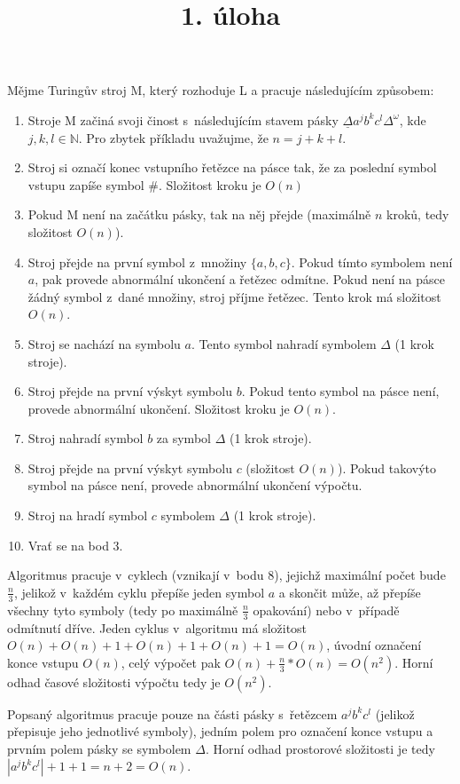 \documentclass[a4paper]{article}
\title {1. úloha}
\begin{document}
\section*{}
Mějme Turingův stroj M, který rozhoduje L a pracuje následujícím způsobem:
\begin{enumerate}
    \item Stroje M začiná svoji činost s~následujícím stavem pásky $\underline{\Delta}a^j b^k c^l\Delta^{\omega}$, kde $j,k,l \in \mathbb{N}$.
    Pro zbytek příkladu uvažujme, že $n=j+k+l$.
    \item Stroj si označí konec vstupního řetězce na pásce tak, že za poslední symbol vstupu zapíše symbol $\#$.
    Složitost kroku je $O(n)$
    \item Pokud M není na začátku pásky, tak na něj přejde (maximálně $n$ kroků, tedy složitost $O(n)$).
    \item Stroj přejde na první symbol z~množiny $\{a,b,c\}$.
    Pokud tímto symbolem není $a$, pak provede abnormální ukončení a řetězec odmítne.
    Pokud není na pásce žádný symbol z~dané množiny, stroj příjme řetězec.
    Tento krok má složitost $O(n)$.
    \item Stroj se nachází na symbolu $a$. Tento symbol nahradí symbolem $\Delta$ (1 krok stroje).
    \item Stroj přejde na první výskyt symbolu $b$.
    Pokud tento symbol na pásce není, provede abnormální ukončení.
    Složitost kroku je $O(n)$.
    \item Stroj nahradí symbol $b$ za symbol $\Delta$ (1 krok stroje).
    \item Stroj přejde na první výskyt symbolu $c$ (složitost $O(n)$).
    Pokud takovýto symbol na pásce není, provede abnormální ukončení výpočtu.
    \item Stroj na hradí symbol $c$ symbolem $\Delta$ (1 krok stroje).
    \item Vrať se na bod 3.
\end{enumerate}
Algoritmus pracuje v~cyklech (vznikají v~bodu 8),
jejichž maximální počet bude $\frac{n}{3}$, jelikož v~každém cyklu přepíše jeden symbol $a$ a skončit může, až přepíše
všechny tyto symboly (tedy po maximálně $\frac{n}{3}$ opakování) nebo v~případě odmítnutí dříve.
Jeden cyklus v~algoritmu má složitost $O(n)+O(n)+1+O(n)+1+O(n)+1=O(n)$, úvodní označení konce vstupu $O(n)$, celý výpočet pak
$O(n)+\frac{n}{3}*O(n)=O(n^2)$. Horní odhad časové složitosti výpočtu tedy je $O(n^2)$.

Popsaný algoritmus pracuje pouze na části pásky s~řetězcem $a^j b^k c^l$ (jelikož přepisuje jeho jednotlivé symboly),
jedním polem pro označení konce vstupu a prvním polem pásky se symbolem $\Delta$.
Horní odhad prostorové složitosti je tedy $|a^j b^k c^l|+1+1=n+2=O(n)$. 
\end{document}

